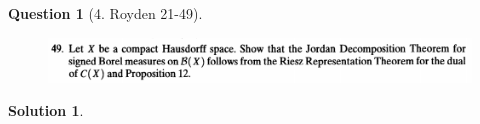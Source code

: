 \documentclass{article} %
\theoremstyle{quest}
\newtheorem*{question}{Question}
\newtheorem*{solution}{Solution}
\begin{document}
\newpage
\begin{question}[4. Royden 21-49]
\hfill
\begin{figure}[h!]
  \centering
    \includegraphics[width=1\textwidth]{21-49.png}
\end{figure}
\end{question}
\begin{solution}

\end{solution}
\end{document}
